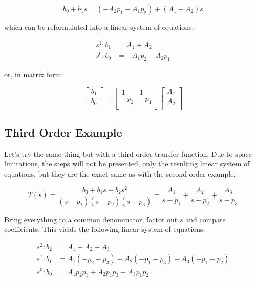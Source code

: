 \begin{equation}
    b_0 + b_1s = (-A_2p_1-A_1p_2) + (A_1+A_2)s
\end{equation}

which can be reformulated into a linear system of equations:

\begin{align}
    s^1: b_1 &= A_1 + A_2 \\
    s^0: b_0 &= -A_1p_2 -A_2p_1
\end{align}

or, in matrix form:

\begin{equation}
    \begin{bmatrix}
        b_1 \\
        b_0 \\
    \end{bmatrix} =
    \begin{bmatrix}
        1    & 1    \\
        -p_2 & -p_1 \\
    \end{bmatrix}
    \begin{bmatrix}
        A_1 \\
        A_2 \\
    \end{bmatrix}
\end{equation}


\subsection{Third Order Example}

Let's  try  the same thing but with a third order transfer  function.  Due  to
space limitations, the steps will not be presented,  only the resulting linear
system of equations, but they are the exact  same  as  with  the  second order
example.

\begin{equation}
    T(s) = \frac{b_0 + b_1s + b_2s^2}{(s-p_1)(s-p_2)(s-p_3)} = \frac{A_1}{s-p_1} + \frac{A_2}{s-p_2} + \frac{A_3}{s-p_3}
\end{equation}

Bring  everything  to  a  common  denominator,  factor  out  $s$  and  compare
coefficients.  This   yields   the   following  linear  system  of  equations:

\begin{align}
    s^2: b_2 &= A_1+A_2+A_3 \\
    s^1: b_1 &= A_1(-p_2-p_3) + A_2(-p_1-p_3) + A_3(-p_1-p_2) \\
    s^0: b_0 &= A_1p_2p_3 + A_2p_1p_3 + A_3p_1p_2
\end{align}

